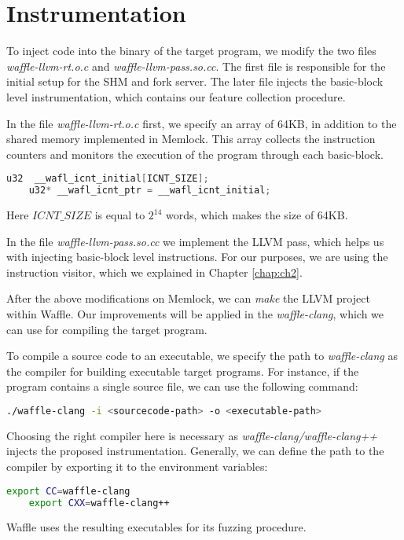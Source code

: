 \section{Instrumentation}

To inject code into the binary of the target program, we modify the two files \textit{waffle-llvm-rt.o.c} and \textit{waffle-llvm-pass.so.cc}. The first file is responsible for the initial setup for the SHM and fork server. The later file injects the basic-block level instrumentation, which contains our feature collection procedure.

In the file \textit{waffle-llvm-rt.o.c} first, we specify an array of 64KB, in addition to the shared memory implemented in Memlock. This array collects the instruction counters and monitors the execution of the program through each basic-block.

\begin{lstlisting}[language=C++,style=CodeStyle,caption={waffle-llvm-rt.o.c},label={lst:memlock}]
    u32  __wafl_icnt_initial[ICNT_SIZE];
    u32* __wafl_icnt_ptr = __wafl_icnt_initial;
\end{lstlisting}

Here $ICNT\_SIZE$ is equal to $2^{14}$ words, which makes the size of 64KB. 

In the file \textit{waffle-llvm-pass.so.cc} we implement the LLVM pass, which helps us with injecting basic-block level instructions. For our purposes, we are using the instruction visitor, which we explained in Chapter \ref{chap:ch2}. 

After the above modifications on Memlock, we can \textit{make} the LLVM project within Waffle. Our improvements will be applied in the \textit{waffle-clang}, which we can use for compiling the target program.

To compile a source code to an executable, we specify the path to \textit{waffle-clang} as the compiler for building executable target programs. For instance, if the program contains a single source file, we can use the following command:

\begin{lstlisting}[language=bash,style=CommandStyle,caption=Compile a single file using waffle-clang]
    ./waffle-clang -i <sourcecode-path> -o <executable-path>
\end{lstlisting}

Choosing the right compiler here is necessary as \textit{waffle-clang/waffle-clang++} injects the proposed instrumentation. Generally, we can define the path to the compiler by exporting it to the environment variables:

\begin{lstlisting}[language=bash,style=CommandStyle,caption=Compile using waffle-clang]
    export CC=waffle-clang
    export CXX=waffle-clang++
\end{lstlisting}

Waffle uses the resulting executables for its fuzzing procedure.
